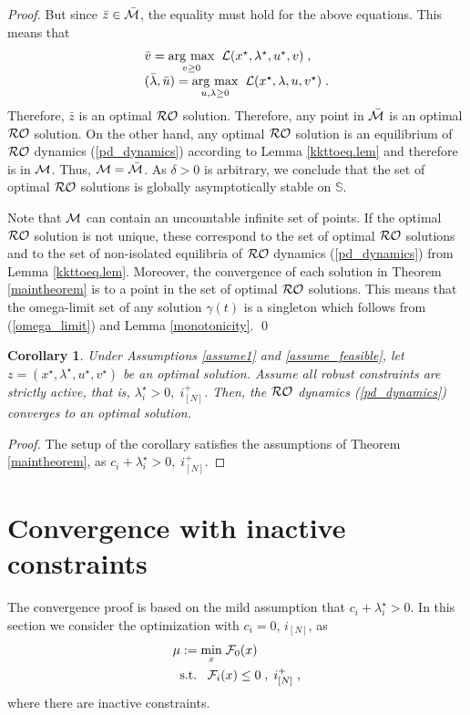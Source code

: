 \documentclass[journal,twoside,web]{ieeecolor}
\newtheorem{corollary}{Corollary}
\newcommand{\argmax}[1]{\underset{#1}{\operatorname{arg}\,\operatorname{max}}\;}
\begin{document}
\begin{proof}
But since $\bar{z}\in \bar {\cal M}$, the equality must hold for the above equations. This means that 
\begin{align*}
\begin{array}{l}
\bar{v}=\argmax{v \geq 0}\; {\cal L}(x^\star,\lambda^\star,u^\star,v)\;,\\
(\bar{\lambda},\bar{u})=\argmax{u,\lambda \geq 0}\; {\cal L}(x^\star,\lambda,u,v^\star)\;.
\end{array}
\end{align*}
Therefore, ${\bar{z}}$ is an optimal ${\cal RO}$ solution. Therefore, any point in $\bar{{\cal M}}$ is an optimal ${\cal RO}$ solution. On the other hand, any optimal ${\cal RO}$ solution is an equilibrium of ${\cal RO}$ dynamics (\ref{pd_dynamics}) according to Lemma \ref{kkttoeq.lem} and therefore is in ${\cal M}$. Thus, ${\cal M}=\bar{\cal M}$. As $\delta>0$ is arbitrary, we conclude that the set of optimal ${\cal RO}$ solutions is globally asymptotically stable on $\mathbb S$.

Note that ${\cal M}$ can contain an uncountable infinite set of points. If the optimal ${\cal RO}$ solution is not unique, these correspond to the set of optimal ${\cal RO}$ solutions and to the set of non-isolated equilibria of ${\cal RO}$ dynamics (\ref{pd_dynamics}) from Lemma \ref{kkttoeq.lem}. Moreover, the convergence of each solution in Theorem \ref{maintheorem} is to a point in the set of optimal ${\cal RO}$ solutions. This means that the omega-limit set of any solution $\gamma(t)$ is a singleton which follows from (\ref{omega_limit}) and Lemma \ref{monotonicity}.
\qed
\end{proof}

\begin{corollary}
Under Assumptions \ref{assume1} and \ref{assume_feasible}, let $z=(x^\star,\lambda^\star,u^\star,v^\star)$ be an optimal solution. 
Assume all robust constraints are strictly active, that is, $\lambda_i^\star>0,\;i^+_{[N]}$. Then, the ${\cal RO}$ dynamics (\ref{pd_dynamics}) converges to an optimal solution.  
\end{corollary}
\begin{proof}
The setup of the corollary satisfies the assumptions of Theorem \ref{maintheorem}, as $c_i+\lambda_i^\star>0,\;i^+_{[N]}$.
\end{proof}


\section{Convergence with inactive constraints} \label{perturbed_section_pddynamics}
The convergence proof is based on the mild assumption that $c_i+\lambda_i^\star>0$.
In this section we consider the optimization with $c_i=0$, $i_{[N]}$, as 
\begin{align} \label{mu_0}
&\mu:=\underset{x}{\min} \; {\cal F}_0(x)\\
&\;\;\text{s.t.}\;\;\;{\cal F}_i(x)\leq 0\;,\;i^+_{[N]}\;,\nonumber
\end{align}
where there are inactive constraints.
\end{document}
